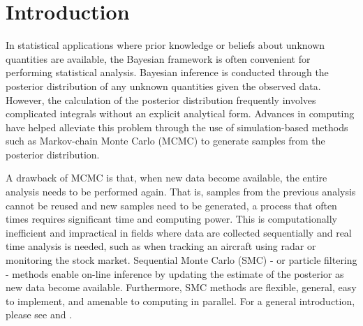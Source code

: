 \documentclass{elsarticle}
\begin{document}
\let\thefootnote\relax{}

\section{Introduction} \label{sec:intro}

In statistical applications where prior knowledge or beliefs about unknown quantities are available, the Bayesian framework is often convenient for performing statistical analysis.  Bayesian inference is conducted through the posterior distribution of any unknown quantities given the observed data. However, the calculation of the posterior distribution frequently involves complicated integrals without an explicit analytical form. Advances in computing have helped alleviate this problem through the use of simulation-based methods such as Markov-chain Monte Carlo (MCMC) \citep{Gelf:Smit:samp:1990} to generate samples from the posterior distribution.

A drawback of MCMC is that, when new data become available, the entire analysis needs to be performed again. That is, samples from the previous analysis cannot be reused and new samples need to be generated, a process that often times requires significant time and computing power. This is computationally inefficient and impractical in fields where data are collected sequentially and real time analysis is needed, such as when tracking an aircraft using radar or monitoring the stock market. Sequential Monte Carlo (SMC) - or particle filtering - methods enable on-line inference by updating the estimate of the posterior as new data become available. Furthermore, SMC methods are flexible, general, easy to implement, and amenable to computing in parallel. For a general introduction, please see \cite{Douc:deFr:Gord:sequ:2001} and \cite{cappe2007overview}.
\end{document}
